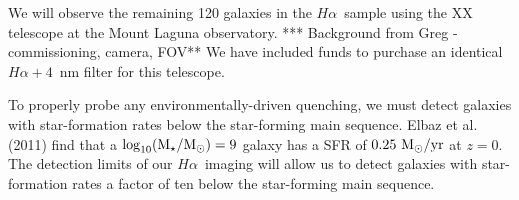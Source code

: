 \documentclass[12pt, preprint]{aastex}
\newcommand{\ha}{$H\alpha$}
\begin{document}
We will observe the remaining 120 galaxies in the \ha \ sample using the
XX telescope at the Mount Laguna observatory.  
*** Background from Greg - commissioning, camera, FOV**
We have included funds to purchase an identical 
$H\alpha+4$~nm filter for this telescope.  


To properly probe any environmentally-driven quenching, we must detect galaxies
with star-formation rates below the star-forming main sequence. Elbaz et al. (2011) find that a
$\rm \log_{10}(M_\star/M_\odot) = 9$ galaxy has a SFR 
of $\rm 0.25~ M_\odot/yr$ at $z = 0$. 
The detection limits of our \ha \ imaging will allow us to detect galaxies with star-formation rates a
factor of ten below the star-forming main sequence.

\end{document}
